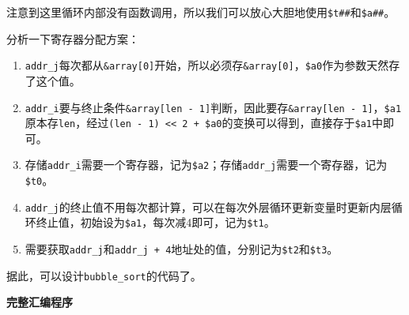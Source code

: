 注意到这里循环内部没有函数调用，所以我们可以放心大胆地使用\texttt{\$t\#\#}和\texttt{\$a\#\#}。

分析一下寄存器分配方案：

\begin{enumerate}
\def\labelenumi{\arabic{enumi}.}
\tightlist
\item
  \texttt{addr\_j}每次都从\texttt{\&array{[}0{]}}开始，所以必须存\texttt{\&array{[}0{]}}，\texttt{\$a0}作为参数天然存了这个值。
\item
  \texttt{addr\_i}要与终止条件\texttt{\&array{[}len\ -\ 1{]}}判断，因此要存\texttt{\&array{[}len\ -\ 1{]}}，\texttt{\$a1}原本存\texttt{len}，经过\texttt{(len\ -\ 1)\ \textless{}\textless{}\ 2\ +\ \$a0}的变换可以得到，直接存于\texttt{\$a1}中即可。
\item
  存储\texttt{addr\_i}需要一个寄存器，记为\texttt{\$a2}；存储\texttt{addr\_j}需要一个寄存器，记为\texttt{\$t0}。
\item
  \texttt{addr\_j}的终止值不用每次都计算，可以在每次外层循环更新变量时更新内层循环终止值，初始设为\texttt{\$a1}，每次减4即可，记为\texttt{\$t1}。
\item
  需要获取\texttt{addr\_j}和\texttt{addr\_j\ +\ 4}地址处的值，分别记为\texttt{\$t2}和\texttt{\$t3}。
\end{enumerate}

据此，可以设计\texttt{bubble\_sort}的代码了。

\textbf{完整汇编程序}

